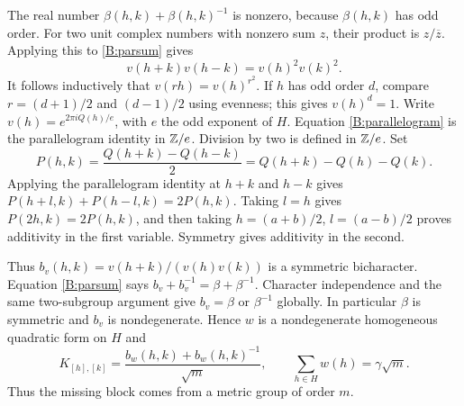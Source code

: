 \documentclass[11pt]{article}
\numberwithin{equation}{section}
\begin{document}
The real number $\beta(h,k)+\beta(h,k)^{-1}$ is nonzero, because $\beta(h,k)$ has odd order. For two unit complex numbers with nonzero sum $z$, their product is $z/\overline z$. Applying this to \eqref{B:parsum} gives
\begin{equation}\label{B:parallelogram}
 v(h+k)v(h-k)=v(h)^2v(k)^2.
\end{equation}
It follows inductively that $v(rh)=v(h)^{r^2}$. If $h$ has odd order $d$, compare $r=(d+1)/2$ and $(d-1)/2$ using evenness; this gives $v(h)^d=1$. Write $v(h)=e^{2\pi i Q(h)/e}$, with $e$ the odd exponent of $H$. Equation \eqref{B:parallelogram} is the parallelogram identity in $\mathbb Z/e$. Division by two is defined in $\mathbb Z/e$. Set
\[
 P(h,k)=\frac{Q(h+k)-Q(h-k)}2
       =Q(h+k)-Q(h)-Q(k).
\]
Applying the parallelogram identity at $h+k$ and $h-k$ gives
$P(h+l,k)+P(h-l,k)=2P(h,k)$. Taking $l=h$ gives $P(2h,k)=2P(h,k)$, and then taking $h=(a+b)/2$, $l=(a-b)/2$ proves additivity in the first variable. Symmetry gives additivity in the second.

Thus $b_v(h,k)=v(h+k)/(v(h)v(k))$ is a symmetric bicharacter. Equation \eqref{B:parsum} says $b_v+b_v^{-1}=\beta+\beta^{-1}$. Character independence and the same two-subgroup argument give $b_v=\beta$ or $\beta^{-1}$ globally. In particular $\beta$ is symmetric and $b_v$ is nondegenerate. Hence $w$ is a nondegenerate homogeneous quadratic form on $H$ and
\begin{equation}\label{B:metricconclusion}
 K_{[h],[k]}=\frac{b_w(h,k)+b_w(h,k)^{-1}}{\sqrt m},\qquad
 \sum_{h\in H}w(h)=\gamma\sqrt m.
\end{equation}
Thus the missing block comes from a metric group of order $m$.
\end{document}
